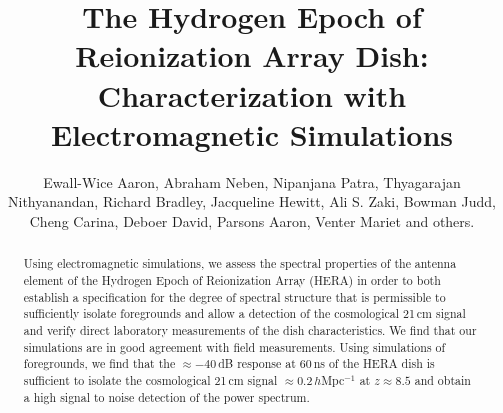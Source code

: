 \documentclass[onecolumn]{emulateapj}
\begin{document}
\title{The Hydrogen Epoch of Reionization Array Dish: Characterization with Electromagnetic Simulations}
\author{
Ewall-Wice Aaron,
Abraham Neben,
Nipanjana Patra,
Thyagarajan Nithyanandan,
Richard Bradley,
Jacqueline Hewitt,
Ali S. Zaki,
Bowman Judd,
Cheng Carina,
Deboer David,
Parsons Aaron,
Venter Mariet
and others.
}

\begin{abstract}
Using electromagnetic simulations, we assess the spectral properties of the antenna element of the Hydrogen Epoch of Reionization Array (HERA) in order to both establish a specification for the degree of spectral structure that is permissible to sufficiently isolate foregrounds and allow a detection of the cosmological 21\,cm signal and verify direct laboratory measurements of the dish characteristics. We find that our simulations are in good agreement with field measurements. Using simulations of foregrounds, we find that the $\approx -40$\,dB response at 60\,ns of the HERA dish is sufficient to isolate the cosmological 21\,cm signal $\approx 0.2$\,$h$Mpc$^{-1}$ at $z\approx 8.5$ and obtain a high signal to noise detection of the power spectrum.
\end{abstract}
\end{document}
